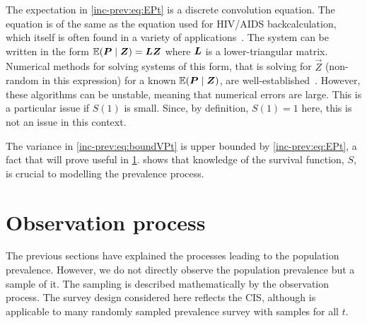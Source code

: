 \documentclass[thesis.tex]{subfiles}
\begin{document}
The expectation in \cref{inc-prev:eq:EPt} is a discrete convolution equation.
The equation is of the same as the equation used for HIV/AIDS backcalculation, which itself is often found in a variety of applications~\autocite[and references therein]{brookmeyerBackcalculation}.
The system can be written in the form $\operatorname{\mathbb{E}}(\bm{P} \mid \bm{Z}) = \bm{L} \bm{Z}$ where $\bm{L}$ is a lower-triangular matrix.
Numerical methods for solving systems of this form, that is solving for $\vec{Z}$ (non-random in this expression) for a known $\operatorname{\mathbb{E}} (\bm{P} \mid \bm{Z} )$, are well-established~\autocite[e.g.:][section 8.2]{highamAccuracy}.
However, these algorithms can be unstable, meaning that numerical errors are large.
This is a particular issue if $S(1)$ is small.
Since, by definition, $S(1)=1$ here, this is not an issue in this context.

The variance in \cref{inc-prev:eq:boundVPt} is upper bounded by \cref{inc-prev:eq:EPt}, a fact that will prove useful in \cref{inc-prev:sec:observation-process}.
 shows that knowledge of the survival function, $S$, is crucial to modelling the prevalence process.

\section{Observation process} \label{inc-prev:sec:observation-process}

The previous sections have explained the processes leading to the population prevalence.
However, we do not directly observe the population prevalence but a sample of it.
The sampling is described mathematically by the observation process.
The survey design considered here reflects the CIS, although is applicable to many randomly sampled prevalence survey with samples for all $t$.
\end{document}
